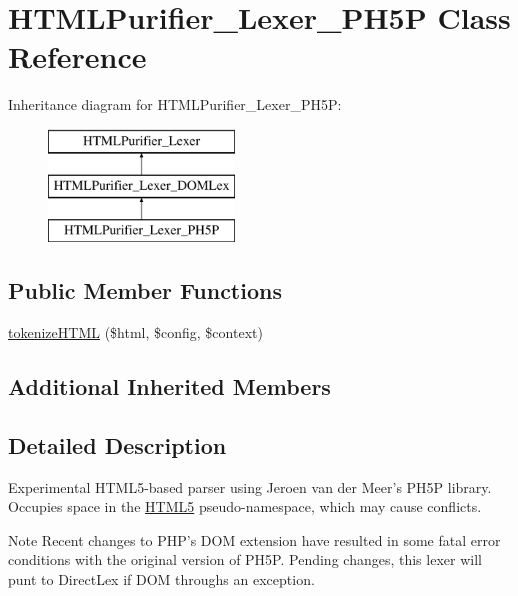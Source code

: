 \hypertarget{classHTMLPurifier__Lexer__PH5P}{\section{H\+T\+M\+L\+Purifier\+\_\+\+Lexer\+\_\+\+P\+H5\+P Class Reference}
\label{classHTMLPurifier__Lexer__PH5P}
}
Inheritance diagram for H\+T\+M\+L\+Purifier\+\_\+\+Lexer\+\_\+\+P\+H5\+P\+:\begin{figure}[H]
\begin{center}
\leavevmode
\includegraphics[height=3.000000cm]{classHTMLPurifier__Lexer__PH5P}
\end{center}
\end{figure}
\subsection*{Public Member Functions}
\begin{DoxyCompactItemize}
\item 
\hyperlink{classHTMLPurifier__Lexer__PH5P_a9b54d0877f0b9cd199b5a1477f23881c}{tokenize\+H\+T\+M\+L} (\$html, \$config, \$context)
\end{DoxyCompactItemize}
\subsection*{Additional Inherited Members}


\subsection{Detailed Description}
Experimental H\+T\+M\+L5-\/based parser using Jeroen van der Meer's P\+H5\+P library. Occupies space in the \hyperlink{classHTML5}{H\+T\+M\+L5} pseudo-\/namespace, which may cause conflicts.

\begin{DoxyNote}{Note}
Recent changes to P\+H\+P's D\+O\+M extension have resulted in some fatal error conditions with the original version of P\+H5\+P. Pending changes, this lexer will punt to Direct\+Lex if D\+O\+M throughs an exception. 
\end{DoxyNote}


